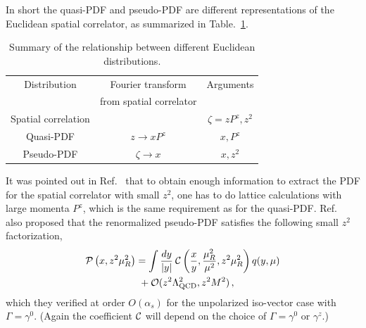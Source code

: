 \documentclass[prd,aps,twocolumn,preprintnumbers,showpacs,nofootinbib,superscriptaddress,notitlepage]{revtex4-1}
\newcommand{\nn}{\nonumber}
\newcommand{\spcorr}{spatial correlator\xspace}
\begin{document}
In short the quasi-PDF and pseudo-PDF are different representations of the Euclidean \spcorr, as summarized in Table.~\ref{tab:I}.
\begin{table}
\begin{center}
	\begin{tabular}{ | c | c | c |}
		\hline
		Distribution & Fourier transform & Arguments\\[-2pt]
		& from \spcorr & \\ \hline
		Spatial correlation  &  & $\zeta = zP^z, z^2$\\ \hline
		Quasi-PDF & $z\to xP^z$ & $x, P^z$\\ \hline
		Pseudo-PDF & $\zeta \to x$ & $x, z^2$\\ \hline
	\end{tabular}
\caption{Summary of the relationship between different Euclidean distributions.}
\label{tab:I}
\end{center}
\end{table}

It was pointed out in Ref.~\cite{Ji:2017rah} that to obtain enough information to extract the PDF for the \spcorr with small $z^2$, one has to do lattice calculations with large momenta $P^z$, which is the same requirement as for the quasi-PDF. Ref.~\cite{Ji:2017rah} also proposed that the renormalized pseudo-PDF satisfies the following small $z^2$ factorization,
\begin{align} \label{eq:pseudofact}
	\mathcal{P} \left( x, z^2\mu_R^2\right)
  &= \int {dy\over |y|}\: \mathcal{C}\left({x\over y}, {\mu_R^2\over \mu^2},z^2\mu_R^2\right) q(y,\mu)
   \nn\\
  &\ + {\cal O}(z^2\Lambda_{\rm QCD}^2, z^2 M^2) \,,
\end{align}
which they verified at order $O(\alpha_s)$ for the unpolarized iso-vector case with $\Gamma=\gamma^0$.  (Again the coefficient ${\cal C}$ will depend on the choice of $\Gamma=\gamma^0$ or $\gamma^z$.)
\end{document}
